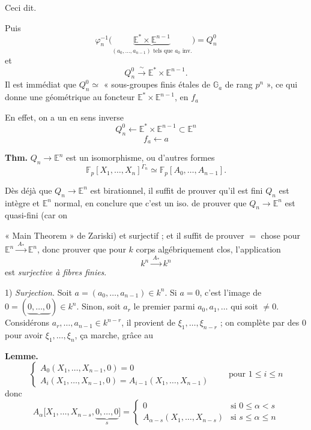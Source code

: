 \documentclass[11pt,a4paper]{article}
\begin{document}
 Ceci dit.

Puis
\[
  \varphi_n^{-1}\bigl(\underbrace{\mathbb{E}^* \times \mathbb{E}^{n-1}}_{(a_0, \dots, a_{n-1}) \text{ tels que } a_0 \text{ inv.}}\bigr) = Q_n^0
\]
et
\[
  Q_n^0 \xrightarrow{\ \sim\ } \mathbb{E}^* \times \mathbb{E}^{n-1} .
\]
 \supplied{[}Il est immédiat que $Q_n^0 \simeq$ « sous-groupes finis
étales de $\mathbb{G}_a$ de rang $p^n$ », ce qui donne une
 géométrique au foncteur 
$\mathbb{E}^* \times \mathbb{E}^{n-1}$, en 
$f_a$ \ill{}\add{]}

En effet, on a un   en sens inverse
\[
  Q_n^0 \longleftarrow \mathbb{E}^* \times \mathbb{E}^{n-1} \subset \mathbb{E}^n
\]
\[
  f_a \longleftarrow a
\]

\textbf{Thm.} $Q_n \longrightarrow \mathbb{E}^n$ est un isomorphisme,
ou d'autres formes
\[
  \mathbb{F}_p[X_1, \dots, X_n]^{\Gamma_n} \simeq \mathbb{F}_p[A_0, \dots, A_{n-1}] .
\]

Dès  déjà que $Q_n \to \mathbb{E}^n$ est birationnel,
il suffit de prouver qu'il est fini
\struck{\ill{}} $Q_n$ est intègre et $\mathbb{E}^n$ normal, en conclure
que c'est un iso. 
\struck{\ill{}} de prouver que $Q_n \to \mathbb{E}^n$ est quasi-fini (car on

« Main Theorem » de Zariski) et surjectif ; et il suffit
de prouver  $=$ chose pour $\mathbb{E}^n \xrightarrow{\ A_*\ } \mathbb{E}^n$,
donc prouver que pour $k$ corps algébriquement clos, l'application
\[
  k^n \xrightarrow{\ A_*\ } k^n
\]
est \emph{surjective à fibres finies}.

1) \emph{Surjection.} Soit $a = (a_0, \dots, a_{n-1}) \in k^n$.
Si $a = 0$, c'est l'image de $0 = (\underbrace{0, \dots, 0}) \in k^n$.
\struck{\ill{}}
Sinon, soit $a_r$ le premier parmi $a_0, a_1, \dots$ qui soit $\neq 0$.
Considérons $a_r, \dots, a_{n-1} \in k^{n-r}$, il provient de
$\xi_1, \dots, \xi_{n-r}$ ; on complète par des $0$ pour avoir
$\xi_1, \dots, \xi_n$, ça marche, grâce au

\textbf{Lemme.}
\[
  \begin{cases}
    A_0(X_1, \dots, X_{n-1}, 0) = 0 \\
    A_i(X_1, \dots, X_{n-1}, 0) = A_{i-1}(X_1, \dots, X_{n-1})
  \end{cases}
  \qquad \text{pour } 1 \leqslant i \leqslant n
\]
donc
\[
  A_\alpha\bigl[X_1, \dots, X_{n-s}, \underbrace{0, \dots, 0}_{s}\bigr] =
  \begin{cases}
    0 & \text{si } 0 \leqslant \alpha < s \\
    A_{\alpha - s}(X_1, \dots, X_{n-s}) & \text{si } s \leqslant \alpha \leqslant n
  \end{cases}
\]
\end{document}
